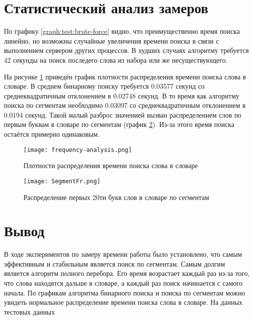     \section{Статистический анализ замеров}
        По графику \ref{graph:test:brute-force} видно, 
        что преимущественно время поиска линейно, 
        но возможны случайные увеличения времени поиска 
        в связи с выполнением сервером других процессов.
        В худших случаях алгоритму требуется 42 секунды 
        на поиск последего слова из набора или же несуществующего. 

        На рисунке \ref{graph:analysis:frequency} приведён график
        плотности распределения времени поиска слова в словаре.
        В среднем бинарному поиску требуется 0.03577 секунд со 
        среднеквадратичным отклонением в 0.02748 секунд.
        В то время как алгоритму поиска по сегментам
        необходимо 0.03097 со среднеквадратичным отклонением в 0.0194 секунд. 
        Такой малый разброс значенией вызван распределением слов по первым буквам
        в словаре по сегментам (график \ref{graph:analysis:frequency:segment}). 
        Из-за этого время поиска остаётся примерно одинаковым.

        \begin{figure}[h!]
            \centering
                \texttt{[image: frequency-analysis.png]}
                \caption{Плотности распределения времени поиска слова в словаре}
                \label{graph:analysis:frequency}
        \end{figure}

        \begin{figure}[h!]
            \centering
                \texttt{[image: SegmentFr.png]}
                \caption{Распределение первых 20ти букв слов в словаре по сегментам}
                \label{graph:analysis:frequency:segment}
        \end{figure}

    \section{Вывод}
        В ходе экспериментов по замеру времени работы было установлено, что 
        самым эффективным и стабильным является поиск по сегментам.
        Самым долгим является алгоритм полного перебора.
        Его время возрастает каждый раз из-за того, 
        что слова находятся дальше в словаре, 
        а каждый раз поиск начинается с самого начала. 
        По графикам алгоритма бинарного поиска и поиска по сегментам 
        можно увидеть нормальное распределение времени поиска слова в словаре.
        На данных тестовых данных 

\newpage